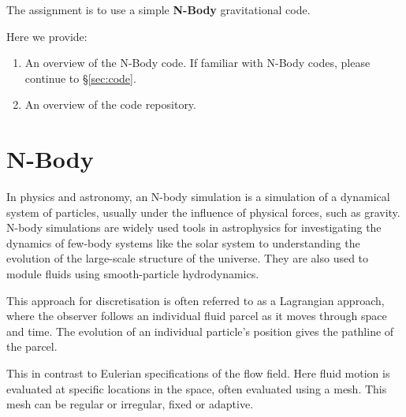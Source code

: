 The assignment is to use a simple \textbf{N-Body} gravitational code. 

Here we provide:
\begin{enumerate}
	\item[\S\ref{sec:nbody}:] An overview of the N-Body code. If familiar with N-Body codes, please continue to \S\ref{sec:code}.
	\item[\S\ref{sec:code}:] An overview of the code repository. 
\end{enumerate}

\section{N-Body}
\label{sec:nbody}
In physics and astronomy, an N-body simulation is a simulation of a dynamical system of particles, usually under the influence of physical forces, such as gravity. N-body simulations are widely used tools in astrophysics for investigating the dynamics of few-body systems like the solar system to understanding the evolution of the large-scale structure of the universe. They are also used to module fluids using smooth-particle hydrodynamics. 

\par 
This approach for discretisation is often referred to as a Lagrangian approach, where the observer follows an individual fluid parcel as it moves through space and time. The evolution of an individual particle's position gives the pathline of the parcel. 

\par 
This in contrast to Eulerian specifications of the flow field. Here fluid motion is evaluated at specific locations in the space, often evaluated using a mesh. This mesh can be regular or irregular, fixed or adaptive. 

